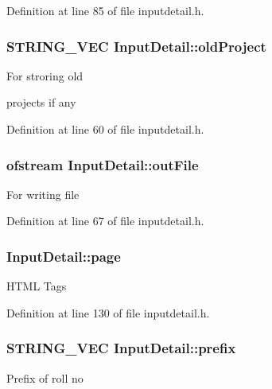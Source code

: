 Definition at line 85 of file inputdetail.\-h.

\hypertarget{classInputDetail_ae8ccc2e838c6d5a93ea544370dc1f272}{
\subsubsection[{old\-Project}]{\setlength{\rightskip}{0pt plus 5cm}S\-T\-R\-I\-N\-G\-\_\-\-V\-E\-C Input\-Detail\-::old\-Project\hspace{0.3cm}{\ttfamily [protected]}}}\label{classInputDetail_ae8ccc2e838c6d5a93ea544370dc1f272}
\begin{DoxyVerb}                 For stroring old
\end{DoxyVerb}
 projects if any 

Definition at line 60 of file inputdetail.\-h.

\hypertarget{classInputDetail_a2b8484cfbfee98ae69e8476f8fd40000}{
\subsubsection[{out\-File}]{\setlength{\rightskip}{0pt plus 5cm}ofstream Input\-Detail\-::out\-File\hspace{0.3cm}{\ttfamily [protected]}}}\label{classInputDetail_a2b8484cfbfee98ae69e8476f8fd40000}
For writing file 

Definition at line 67 of file inputdetail.\-h.

\hypertarget{classInputDetail_ae487757aaafba4ac372c327e2b7a9673}{
\subsubsection[{page}]{ Input\-Detail\-::page}}\label{classInputDetail_ae487757aaafba4ac372c327e2b7a9673}
H\-T\-M\-L Tags 

Definition at line 130 of file inputdetail.\-h.

\hypertarget{classInputDetail_af81c2cdf9b1336634bbb33165921d879}{
\subsubsection[{prefix}]{\setlength{\rightskip}{0pt plus 5cm}S\-T\-R\-I\-N\-G\-\_\-\-V\-E\-C Input\-Detail\-::prefix\hspace{0.3cm}{\ttfamily [protected]}}}\label{classInputDetail_af81c2cdf9b1336634bbb33165921d879}
Prefix of roll no 

